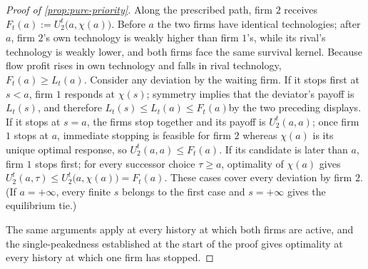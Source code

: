 \documentclass[12pt,reqno]{article}
\theoremstyle{definition} \newtheorem{example}{Example}
\theoremstyle{definition} \newtheorem{condition}{Condition}
\theoremstyle{definition} \newtheorem{corollary}{Corollary}
\theoremstyle{definition} \newtheorem{claim}{Claim}
\theoremstyle{definition} \newtheorem{definition}{Definition}
\theoremstyle{definition} \newtheorem{conjecture}{Conjecture}
\theoremstyle{definition} \newtheorem{Lemma}{Lemma}
\theoremstyle{definition} \newtheorem{lemma}{Lemma}
\theoremstyle{plain} \newtheorem{theorem}{Theorem}
\theoremstyle{definition} \newtheorem{assumption}{Assumption}
\theoremstyle{definition} \newtheorem*{assumptionnonumber}{Assumption}
\theoremstyle{definition} \newtheorem*{theoremNoNumber}{Proposition}
\theoremstyle{definition}
\theoremstyle{definition}\newtheorem{proposition}{Proposition}
\theoremstyle{definition} \newtheorem{result}{Result}
\theoremstyle{definition} \newtheorem*{definitionNoNumber}{Definition}
\theoremstyle{definition} \newtheorem{Definition}{Definition}
\theoremstyle{definition} \newtheorem*{DefinitionNoNumber}{Definition}
\theoremstyle{definition} \newtheorem*{fact}{Fact}
\theoremstyle{definition} \newtheorem*{property}{Property}
\theoremstyle{definition} \newtheorem{remark}{Remark}
\begin{document}
\begin{proof}[Proof of \cref{prop:pure-priority}]
Along the prescribed path, firm $2$ receives $F_t(a):=U_2^t\big(a,\chi(a)\big)$. Before $a$ the two firms have identical technologies; after $a$, firm $2$'s own technology is weakly higher than firm $1$'s, while its rival's technology is weakly lower, and both firms face the same survival kernel. Because flow profit rises in own technology and falls in rival technology,
$
F_t(a)\ge L_t(a).
$
Consider any deviation by the waiting firm. If it stops first at $s<a$, firm $1$ responds at $\chi(s)$; symmetry implies that the deviator's payoff is  $L_t(s)$, and therefore
$
L_t(s)\le L_t(a)\le F_t(a)
$by the two preceding displays. If it stops at $s=a$, the firms stop together and its payoff is $U_2^t(a,a)$; once firm $1$ stops at $a$, immediate stopping is feasible for firm $2$ whereas $\chi(a)$ is its unique optimal response, so
$
U_2^t(a,a)\le F_t(a).
$
If its candidate is later than $a$, firm $1$ stops first; for every successor choice $\tau\ge a$, optimality of $\chi(a)$ gives
$
U_2^t(a,\tau)\le U_2^t\big(a,\chi(a)\big)=F_t(a).
$
These cases cover every  deviation by firm $2$. (If $a=+\infty$, every finite $s$ belongs to the first case and $s=+\infty$ gives the equilibrium tie.)

The same arguments apply at every history at which both firms are active, and the single-peakedness established at the start of the proof gives optimality at every history at which one firm has stopped. 
\end{proof}
\end{document}
